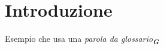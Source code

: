 \section{Introduzione}

Esempio che usa una
\emph{parola da glossario}\textsubscript{\textit{\textbf{G}}}
